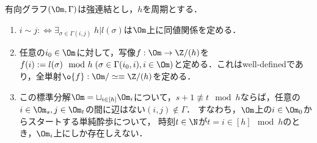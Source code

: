 \documentclass[uplatex, dvipdfmx]{jsreport}
\begin{document}
\begin{proposition}[強連結な有向グラフの標準分解]
    有向グラフ$(\Om,\Gamma)$は強連結とし，$h$を周期とする．
    \begin{enumerate}
        \item $i\sim j:\Leftrightarrow\exists_{\sigma\in\Gamma(i,j)}\;h|l(\sigma)$は$\Om$上に同値関係を定める．
        \item 任意の$i_0\in\Om$に対して，写像$f:\Om\to\Z/(h)$を$f(i):=l(\sigma)\mod h\;(\sigma\in\Gamma(i_0,i),i\in\Om)$と定める．これはwell-definedであり，全単射$\o{f}:\Om/\simeq\equiv\Z/(h)$を定める．
        \item この標準分解$\Om=\sqcup_{i\in[h]}\Om_i$について，$s+1\not\equiv t\mod h$ならば，任意の$i\in\Om_s,j\in\Om_t$の間に辺はない$(i,j)\notin\Gamma$．
        すなわち，$\Om$上の$i\in\Om_0$からスタートする単純酔歩について，
        時刻$t\in\N$が$t=i\in[h]\mod h$のとき，$\Om_i$上にしか存在しえない．
    \end{enumerate}
\end{proposition}
\end{document}

